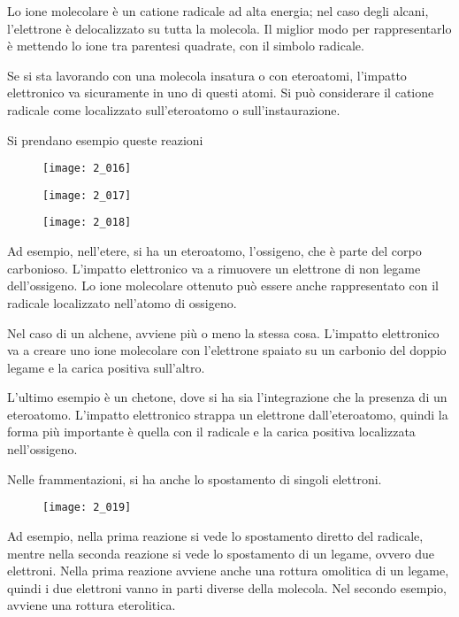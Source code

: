 Lo ione molecolare è un catione radicale ad alta energia; nel caso degli
alcani, l'elettrone è delocalizzato su tutta la molecola. Il miglior
modo per rappresentarlo è mettendo lo ione tra parentesi quadrate, con
il simbolo radicale.

Se si sta lavorando con una molecola insatura o con eteroatomi,
l'impatto elettronico va sicuramente in uno di questi atomi. Si può
considerare il catione radicale come localizzato sull'eteroatomo o
sull'instaurazione.

Si prendano esempio queste reazioni

\begin{figure}[H]
  \texttt{[image: 2\_016]}
\end{figure}

\begin{figure}[H]
  \texttt{[image: 2\_017]}
\end{figure}

\begin{figure}[H]
  \texttt{[image: 2\_018]}
\end{figure}

Ad esempio, nell'etere, si ha un eteroatomo, l'ossigeno, che è parte del
corpo carbonioso. L'impatto elettronico va a rimuovere un elettrone di
non legame dell'ossigeno. Lo ione molecolare ottenuto può essere anche
rappresentato con il radicale localizzato nell'atomo di ossigeno.

Nel caso di un alchene, avviene più o meno la stessa cosa. L'impatto
elettronico va a creare uno ione molecolare con l'elettrone spaiato su
un carbonio del doppio legame e la carica positiva sull'altro.

L'ultimo esempio è un chetone, dove si ha sia l'integrazione che la
presenza di un eteroatomo. L'impatto elettronico strappa un elettrone
dall'eteroatomo, quindi la forma più importante è quella con il radicale
e la carica positiva localizzata nell'ossigeno.


Nelle frammentazioni, si ha anche lo spostamento di singoli elettroni.

\begin{figure}[H]
  \texttt{[image: 2\_019]}
\end{figure}

Ad esempio, nella prima reazione si vede lo spostamento diretto del
radicale, mentre nella seconda reazione si vede lo spostamento di un
legame, ovvero due elettroni. Nella prima reazione avviene anche una
rottura omolitica di un legame, quindi i due elettroni vanno in parti
diverse della molecola. Nel secondo esempio, avviene una rottura
eterolitica.

